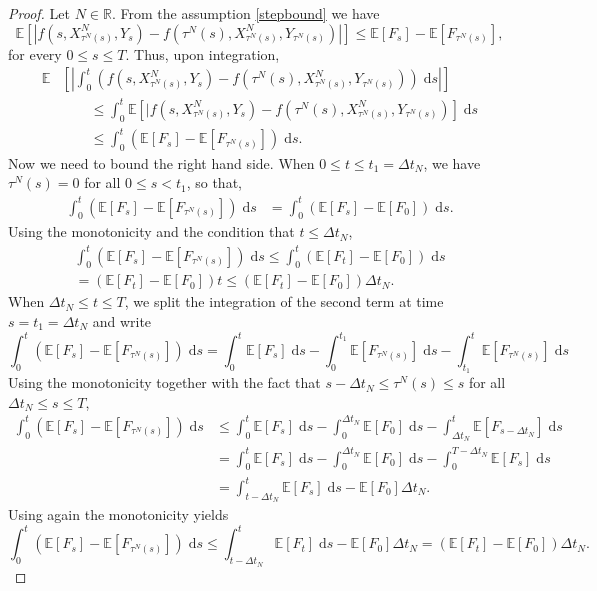 \documentclass[reqno,12pt]{amsart}
\theoremstyle{plain}%
\theoremstyle{definition}
\begin{document}
\begin{proof}
    Let $N\in \mathbb{R}$. From the assumption \eqref{stepbound} we have
    \[
        \mathbb{E}\left[|f(s, X_{\tau^N(s)}^N, Y_s) - f(\tau^N(s), X_{\tau^N(s)}^N, Y_{\tau^N(s)})|\right] \leq \mathbb{E}[F_s] - \mathbb{E}[F_{\tau^N(s)}],
    \]
    for every $0\leq s \leq T$. Thus, upon integration,
    \begin{align*}
        \mathbb{E}&\left[\left|\int_0^t \left( f(s, X_{\tau^N(s)}^N, Y_s) - f(\tau^N(s), X_{\tau^N(s)}^N, Y_{\tau^N(s)}) \right)\;\mathrm{d}s\right|\right] \\
        & \qquad \leq \int_0^t \mathbb{E}\left[|f(s, X_{\tau^N(s)}^N, Y_s) - f(\tau^N(s), X_{\tau^N(s)}^N, Y_{\tau^N(s)}) \right]\;\mathrm{d}s \\
        & \qquad \leq \int_0^t \left(\mathbb{E}[F_s] - \mathbb{E}[F_{\tau^N(s)}]\right)\;\mathrm{d}s.
    \end{align*}
    Now we need to bound the right hand side. When $0 \leq t\leq t_1 = \Delta t_N$, we have $\tau^N(s) = 0$ for all $0 \leq s < t_1$, so that,
    \begin{align*}
      \int_0^t (\mathbb{E}[F_s] - \mathbb{E}[F_{\tau^N(s)}])\;\mathrm{d}s & = \int_0^t (\mathbb{E}[F_s] - \mathbb{E}[F_{0}]) \;\mathrm{d}s.
    \end{align*}
    Using the monotonicity and the condition that $t \leq \Delta t_N$,
    \begin{multline*}
      \int_0^t (\mathbb{E}[F_s] - \mathbb{E}[F_{\tau^N(s)}])\;\mathrm{d}s \leq \int_0^t (\mathbb{E}[F_t] - \mathbb{E}[F_0]) \;\mathrm{d}s  \\
      = (\mathbb{E}[F_t] - \mathbb{E}[F_0])t \leq (\mathbb{E}[F_t] - \mathbb{E}[F_0])\Delta t_N.
    \end{multline*}
    When $\Delta t_N\leq t \leq T$, we split the integration of the second term at time $s = t_1 = \Delta t_N$ and write
    \[ 
      \int_0^t (\mathbb{E}[F_s] - \mathbb{E}[F_{\tau^N(s)}])\;\mathrm{d}s = \int_0^t \mathbb{E}[F_s] \;\mathrm{d}s - \int_0^{t_1} \mathbb{E}[F_{\tau^N(s)}]\;\mathrm{d}s - \int_{t_1}^t \mathbb{E}[F_{\tau^N(s)}]\;\mathrm{d}s
    \]
    Using the monotonicity together with the fact that $s - \Delta t_N\leq \tau^N(s) \leq s$ for all $\Delta t_N\leq s \leq T$,
    \begin{align*}
        \int_0^t (\mathbb{E}[F_s] - \mathbb{E}[F_{\tau^N(s)}])\;\mathrm{d}s & \leq \int_0^t \mathbb{E}[F_s] \;\mathrm{d}s - \int_0^{\Delta t_N} \mathbb{E}[F_0]\;\mathrm{d}s - \int_{\Delta t_N}^t \mathbb{E}[F_{s-\Delta t_N}]\;\mathrm{d}s \\
        & = \int_0^t \mathbb{E}[F_s] \;\mathrm{d}s - \int_0^{\Delta t_N} \mathbb{E}[F_0]\;\mathrm{d}s - \int_{0}^{T-\Delta t_N} \mathbb{E}[F_s]\;\mathrm{d}s \\
        & = \int_{t-\Delta t_N}^t \mathbb{E}[F_s] \;\mathrm{d}s - \mathbb{E}[F_0]\Delta t_N.
    \end{align*}
    Using again the monotonicity yields
    \[ 
      \int_0^t (\mathbb{E}[F_s] - \mathbb{E}[F_{\tau^N(s)}])\;\mathrm{d}s \leq \int_{t-\Delta t_N}^t \mathbb{E}[F_t] \;\mathrm{d}s - \mathbb{E}[F_0]\Delta t_N= (\mathbb{E}[F_t] - \mathbb{E}[F_0])\Delta t_N.
    \]


\end{proof}
\end{document}
